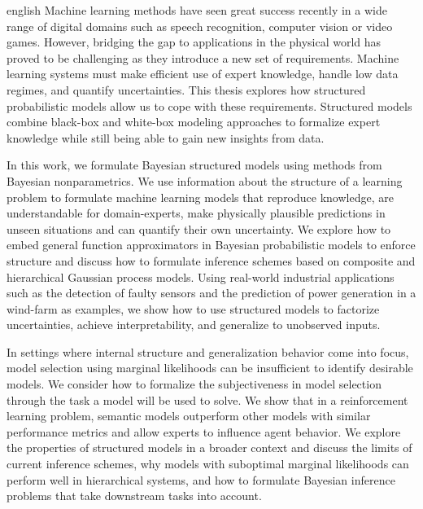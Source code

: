 \begin{Abstract}{english}
    Machine learning methods have seen great success recently in a wide range of digital domains such as speech recognition, computer vision or video games.
    However, bridging the gap to applications in the physical world has proved to be challenging as they introduce a new set of requirements.
    Machine learning systems must make efficient use of expert knowledge, handle low data regimes, and quantify uncertainties.
    This thesis explores how structured probabilistic models allow us to cope with these requirements.
    Structured models combine black-box and white-box modeling approaches to formalize expert knowledge while still being able to gain new insights from data.

    In this work, we formulate Bayesian structured models using methods from Bayesian nonparametrics.
    We use information about the structure of a learning problem to formulate machine learning models that reproduce knowledge, are understandable for domain-experts, make physically plausible predictions in unseen situations and can quantify their own uncertainty.
    We explore how to embed general function approximators in Bayesian probabilistic models to enforce structure and discuss how to formulate inference schemes based on composite and hierarchical Gaussian process models.
    Using real-world industrial applications such as the detection of faulty sensors and the prediction of power generation in a wind-farm as examples, we show how to use structured models to factorize uncertainties, achieve interpretability, and generalize to unobserved inputs.

    In settings where internal structure and generalization behavior come into focus, model selection using marginal likelihoods can be insufficient to identify desirable models.
    We consider how to formalize the subjectiveness in model selection through the task a model will be used to solve.
    We show that in a reinforcement learning problem, semantic models outperform other models with similar performance metrics and allow experts to influence agent behavior.
    We explore the properties of structured models in a broader context and discuss the limits of current inference schemes, why models with suboptimal marginal likelihoods can perform well in hierarchical systems, and how to formulate Bayesian inference problems that take downstream tasks into account.
\end{Abstract}

